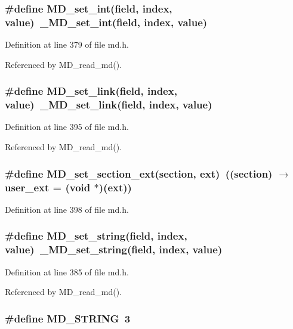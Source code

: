\subsubsection{\setlength{\rightskip}{0pt plus 5cm}\#define MD\_\-set\_\-int(field, index, value)~\_\-MD\_\-set\_\-int(field, index, value)}\label{md_8h_d3609a2cbc1a05b0cffb684d3dbbd573}




Definition at line 379 of file md.h.

Referenced by MD\_\-read\_\-md().
\subsubsection{\setlength{\rightskip}{0pt plus 5cm}\#define MD\_\-set\_\-link(field, index, value)~\_\-MD\_\-set\_\-link(field, index, value)}\label{md_8h_c1642c81252810b1792fac58dfb79777}




Definition at line 395 of file md.h.

Referenced by MD\_\-read\_\-md().
\subsubsection{\setlength{\rightskip}{0pt plus 5cm}\#define MD\_\-set\_\-section\_\-ext(section, ext)~((section) $\rightarrow$ user\_\-ext = (void $\ast$)(ext))}\label{md_8h_94d6ecb4c2091939af6de77685791a2f}




Definition at line 398 of file md.h.
\subsubsection{\setlength{\rightskip}{0pt plus 5cm}\#define MD\_\-set\_\-string(field, index, value)~\_\-MD\_\-set\_\-string(field, index, value)}\label{md_8h_ce4e2520515e16050f27d7b86196e82a}




Definition at line 385 of file md.h.

Referenced by MD\_\-read\_\-md().
\subsubsection{\setlength{\rightskip}{0pt plus 5cm}\#define MD\_\-STRING~3}\label{md_8h_00aaba1fc61d6e7046112b9477287b70}




